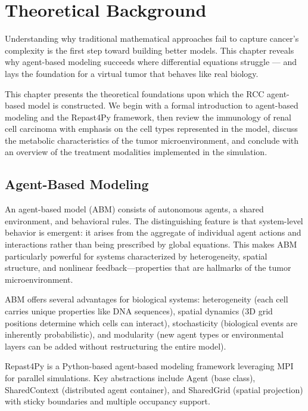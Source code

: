 \chapter{Theoretical Background}
\label{ch:theoretical_background}

Understanding why traditional mathematical approaches fail to capture cancer's complexity is the first step toward building better models. This chapter reveals why agent-based modeling succeeds where differential equations struggle --- and lays the foundation for a virtual tumor that behaves like real biology.

This chapter presents the theoretical foundations upon which the RCC agent-based model is constructed. We begin with a formal introduction to agent-based modeling and the Repast4Py framework, then review the immunology of renal cell carcinoma with emphasis on the cell types represented in the model, discuss the metabolic characteristics of the tumor microenvironment, and conclude with an overview of the treatment modalities implemented in the simulation.

\section{Agent-Based Modeling}
\label{sec:bg_abm}

An agent-based model (ABM) consists of autonomous agents, a shared environment, and behavioral rules. The distinguishing feature is that system-level behavior is emergent: it arises from the aggregate of individual agent actions and interactions rather than being prescribed by global equations. This makes ABM particularly powerful for systems characterized by heterogeneity, spatial structure, and nonlinear feedback—properties that are hallmarks of the tumor microenvironment.

ABM offers several advantages for biological systems: heterogeneity (each cell carries unique properties like DNA sequences), spatial dynamics (3D grid positions determine which cells can interact), stochasticity (biological events are inherently probabilistic), and modularity (new agent types or environmental layers can be added without restructuring the entire model).

Repast4Py is a Python-based agent-based modeling framework leveraging MPI for parallel simulations. Key abstractions include Agent (base class), SharedContext (distributed agent container), and SharedGrid (spatial projection) with sticky boundaries and multiple occupancy support.

